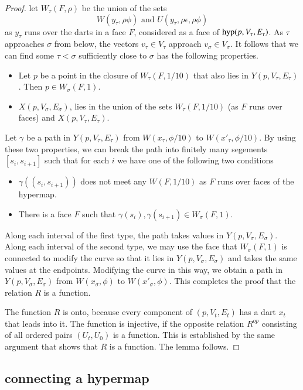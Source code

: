 \begin{proof}
let $W_\tau(F,\rho)$ be the union of the sets
   $$W(y_\tau,\rho\phi) \text{ and } U(y_\tau,\rho\epsilon,\rho\phi)$$
as $y_\tau$ runs over the darts in a face $F$, considered as a face
of ${\operatorname{hyp}}(p,V_\tau,E_\tau)$.
As $\tau$ approaches $\sigma$ from below, the vectors $v_\tau\in V_\tau$
approach $v_\sigma\in V_\sigma$.  It follows that we can find
some $\tau<\sigma$ sufficiently close to $\sigma$ has the
following properties.
\begin{itemize}
 \item Let $p$ be a point in the closure of $W_\tau(F,1/10)$ that
   also lies in $Y(p,V_\tau,E_\tau)$.  Then $p\in W_\sigma(F,1)$.
 \item  $X(p,V_\sigma,E_\sigma)$, lies in the union of the
  sets $W_\tau(F,1/10)$ (as $F$ runs over faces) and $X(p,V_\tau,E_\tau)$.
\end{itemize}
Let $\gamma$ be a path in $Y(p,V_\tau,E_\tau)$ from $W(x_\tau,\phi/10)$
to $W(x'_\tau,\phi/10)$.  By using these two properties, 
we can break the path into finitely many
segements $[s_i,s_{i+1}]$ such that for each $i$ we have one
of the following two conditions
\begin{itemize} 
\item
$\gamma({(s_i,s_{i+1})})$ does not meet any
$W(F,1/10)$ as $F$ runs over faces of the hypermap.
\item There is a face $F$ such that
$\gamma(s_i), \gamma(s_{i+1})\in W_\sigma(F,1)$.
\end{itemize}
Along each interval of the first type, the path takes values in
$Y(p,V_\sigma,E_\sigma)$.  Along each interval of the second type,
we may use the face that $W_\sigma(F,1)$ is connected to modify
the curve so that it lies in $Y(p,V_\sigma,E_\sigma)$ and takes
the same values at the endpoints.  Modifying the curve in this way,
we obtain a path in $Y(p,V_\sigma,E_\sigma)$
from $W(x_\sigma,\phi)$ to $W(x'_\sigma,\phi)$.  This completes
the proof that the relation $R$ is a function.

The function $R$ is onto, because every component of $(p,V_t,E_t)$
has a dart $x_t$ that leads into it.  The function is injective,
if the opposite relation $R^{op}$ consisting of all ordered pairs
$(U_t,U_0)$ is a function.  This is established by the same argument
that shows that $R$ is a function.  The lemma follows. 
\end{proof}

\subsection{connecting a hypermap}


